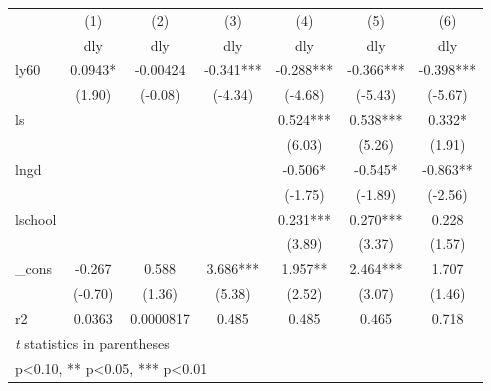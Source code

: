 {
\def\sym#1{\ifmmode^{#1}\else\(^{#1}\)\fi}
\begin{tabular}{l*{6}{c}}
\hline\hline
            &\multicolumn{1}{c}{(1)}&\multicolumn{1}{c}{(2)}&\multicolumn{1}{c}{(3)}&\multicolumn{1}{c}{(4)}&\multicolumn{1}{c}{(5)}&\multicolumn{1}{c}{(6)}\\
            &\multicolumn{1}{c}{dly}&\multicolumn{1}{c}{dly}&\multicolumn{1}{c}{dly}&\multicolumn{1}{c}{dly}&\multicolumn{1}{c}{dly}&\multicolumn{1}{c}{dly}\\
\hline
ly60        &      0.0943*  &    -0.00424   &      -0.341***&      -0.288***&      -0.366***&      -0.398***\\
            &      (1.90)   &     (-0.08)   &     (-4.34)   &     (-4.68)   &     (-5.43)   &     (-5.67)   \\
[1em]
ls          &               &               &               &       0.524***&       0.538***&       0.332*  \\
            &               &               &               &      (6.03)   &      (5.26)   &      (1.91)   \\
[1em]
lngd        &               &               &               &      -0.506*  &      -0.545*  &      -0.863** \\
            &               &               &               &     (-1.75)   &     (-1.89)   &     (-2.56)   \\
[1em]
lschool     &               &               &               &       0.231***&       0.270***&       0.228   \\
            &               &               &               &      (3.89)   &      (3.37)   &      (1.57)   \\
[1em]
\_cons      &      -0.267   &       0.588   &       3.686***&       1.957** &       2.464***&       1.707   \\
            &     (-0.70)   &      (1.36)   &      (5.38)   &      (2.52)   &      (3.07)   &      (1.46)   \\
\hline
r2          &      0.0363   &   0.0000817   &       0.485   &       0.485   &       0.465   &       0.718   \\
\hline\hline
\multicolumn{7}{l}{\footnotesize \textit{t} statistics in parentheses}\\
\multicolumn{7}{l}{\footnotesize * p<0.10, ** p<0.05, *** p<0.01}\\
\end{tabular}
}
